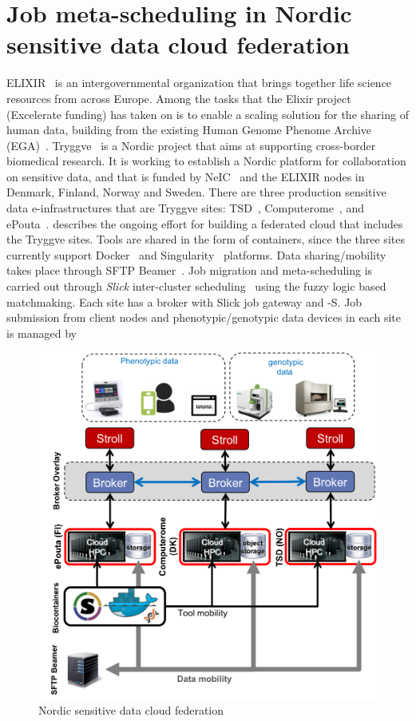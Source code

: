 \section{Job meta-scheduling in Nordic sensitive data cloud federation}
\label{sec:stroll-tryggve}
ELIXIR~\cite{elixir} is an intergovernmental organization that brings together life science resources from across Europe. Among the tasks that the Elixir project (Excelerate funding) has taken on is to enable a scaling solution for the sharing of human data, building from the existing Human Genome Phenome Archive (EGA)~\cite{excelerate-wp9}. Tryggve~\cite{tryggve} is a Nordic project that aims at supporting cross-border biomedical research. It is working to establish a Nordic platform for collaboration on sensitive data, and that is funded by NeIC~\cite{neic} and the ELIXIR nodes in Denmark, Finland, Norway and Sweden. There are three production sensitive data e-infrastructures that are Tryggve sites: TSD~\cite{tsd}, Computerome~\cite{computerome}, and ePouta~\cite{epouta}.  describes the ongoing effort for building a federated cloud that includes the Tryggve sites. Tools are shared in the form of containers, since the three sites currently support Docker~\cite{docker} and Singularity~\cite{singularity} platforms. Data sharing/mobility takes place through SFTP Beamer~\cite{sftp-beamer}. Job migration and meta-scheduling is carried out through \textit{Slick} inter-cluster scheduling~\cite{slick1,slick2} using the fuzzy logic based matchmaking. Each site has a broker with Slick job gateway and \name-S. Job submission from client nodes and phenotypic/genotypic data devices in each site is managed by \name  
\begin{figure}[hbt]
	\centering
	\includegraphics[width=.5\textwidth]{figures/tryggve-model}            
	\caption{Nordic sensitive data cloud federation}
	\label{fig:stroll-tryggve}
\end{figure}

